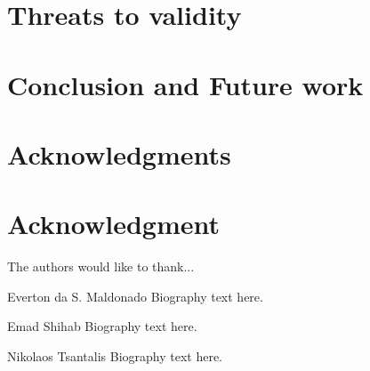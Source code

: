 \documentclass[10pt,journal,compsoc]{IEEEtran}
\begin{document}
\section{Threats to validity}
\label{sec:threats_to_validity}


\section{Conclusion and Future work}
\label{sec:conclusion}





\ifCLASSOPTIONcompsoc
  \section*{Acknowledgments}
\else
  \section*{Acknowledgment}
\fi


The authors would like to thank...


\ifCLASSOPTIONcaptionsoff
  \newpage
\fi



 

% 

\begin{IEEEbiography}{Everton da S. Maldonado}
Biography text here.
\end{IEEEbiography}

\begin{IEEEbiography}{Emad Shihab}
Biography text here.
\end{IEEEbiography}

\begin{IEEEbiography}{Nikolaos Tsantalis}
Biography text here.
\end{IEEEbiography}



\appendices

\end{document}
